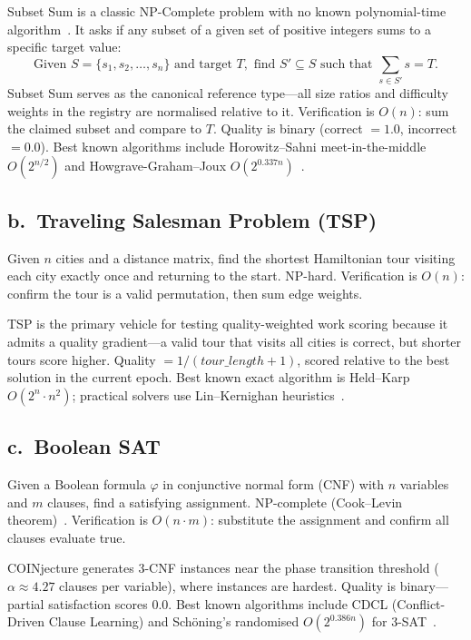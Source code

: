 \documentclass[12pt,letterpaper]{article}
\begin{document}
Subset Sum is a classic NP-Complete problem with no known polynomial-time algorithm~\cite{karp1972}.
It asks if any subset of a given set of positive integers sums to a specific target value:
\[
  \text{Given } S = \{s_1, s_2, \ldots, s_n\} \text{ and target } T,
  \text{ find } S' \subseteq S \text{ such that } \sum_{s \in S'} s = T.
\]
Subset Sum serves as the canonical reference type---all size ratios and difficulty weights in the registry
are normalised relative to it. Verification is $O(n)$: sum the claimed subset and compare to $T$. Quality
is binary (correct $= 1.0$, incorrect $= 0.0$). Best known algorithms include Horowitz--Sahni
meet-in-the-middle $O(2^{n/2})$ and Howgrave-Graham--Joux $O(2^{0.337n})$~\cite{horowitz1974,howgrave2010}.

\subsection*{b.\ Traveling Salesman Problem (TSP)}

Given $n$ cities and a distance matrix, find the shortest Hamiltonian tour visiting each city exactly once
and returning to the start. NP-hard. Verification is $O(n)$: confirm the tour is a valid permutation, then
sum edge weights.

TSP is the primary vehicle for testing quality-weighted work scoring because it admits a quality
gradient---a valid tour that visits all cities is correct, but shorter tours score higher.
Quality $= 1 / (\mathit{tour\_length} + 1)$, scored relative to the best solution in the current epoch.
Best known exact algorithm is Held--Karp $O(2^n \cdot n^2)$; practical solvers use Lin--Kernighan
heuristics~\cite{held1962,lin1973}.

\subsection*{c.\ Boolean SAT}

Given a Boolean formula $\varphi$ in conjunctive normal form (CNF) with $n$ variables and $m$ clauses,
find a satisfying assignment. NP-complete (Cook--Levin theorem)~\cite{cook1971}. Verification is
$O(n \cdot m)$: substitute the assignment and confirm all clauses evaluate true.

COINjecture generates 3-CNF instances near the phase transition threshold ($\alpha \approx 4.27$ clauses
per variable), where instances are hardest. Quality is binary---partial satisfaction scores 0.0. Best known
algorithms include CDCL (Conflict-Driven Clause Learning) and Sch\"{o}ning's randomised
$O(2^{0.386n})$ for 3-SAT~\cite{marques1999,schoning1999}.
\end{document}
